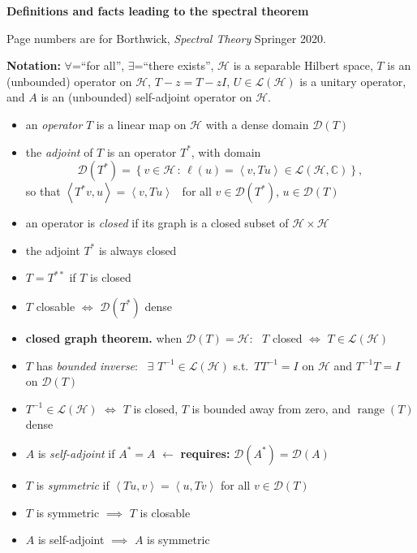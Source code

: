 \documentclass[11pt]{article}
\newcommand{\cD}{\mathcal{D}}
\newcommand{\cH}{\mathcal{H}}
\newcommand{\cL}{\mathcal{L}}
\newcommand{\CC}{\mathbb{C}}
\newcommand{\ip}[2]{\left<#1,#2\right>}
\newcommand{\range}{\operatorname{range}}
\newcommand{\sect}[1]{\subsection*{#1.}}
\begin{document}
\strut
\centerline{{\Large \textbf{Definitions and facts leading to the spectral theorem}}}

\normalsize
\medskip

Page numbers are for Borthwick, \emph{Spectral Theory} Springer 2020.

\textbf{Notation:} $\forall$=``for all'', $\exists$=``there exists'', $\cH$ is a separable Hilbert space, $T$ is an (unbounded) operator on $\cH$, $T-z=T-zI$, $U \in \cL(\cH)$ is a unitary operator, and $A$ is an (unbounded) self-adjoint operator on $\cH$.


\newcommand{\itwo}[2]{{\small \textbf{#1}} {\footnotesize p #2} \,\,}
\newcommand{\df}[1]{\,\itwo{def}{#1}}
\newcommand{\ft}[1]{\itwo{\underline{fact}}{#1}}

\begin{itemize}[leftmargin=10mm,itemsep=0mm]
\item[\df{36}] an \emph{operator} $T$ is a linear map on $\cH$ with a dense domain $\cD(T)$
\item[\df{38}] the \emph{adjoint} of $T$ is an operator $T^*$, with domain
	$$\cD(T^*) = \left\{v\in\cH\,:\,\ell(u)=\ip{v}{Tu} \in \cL(\cH,\CC)\right\},$$
so that $\ip{T^* v}{u} = \ip{v}{Tu}$ \, for all $v\in\cD(T^*)$, $u\in\cD(T)$
\item[\df{41}] an operator is \emph{closed} if its graph is a closed subset of $\cH\times \cH$
\item[\ft{43}] the adjoint $T^*$ is always closed
\item[\ft{44}] $T=T^{**}$ if $T$ is closed
\item[\ft{44}] $T$ closable $\iff$ $\cD(T^*)$ dense
\item[\ft{44}] \textbf{closed graph theorem.} when $\cD(T)=\cH$: \, $T$ closed $\iff$ $T\in\cL(\cH)$
\item[\df{46}] $T$ has \emph{bounded inverse}: \, $\exists$ $T^{-1}\in\cL(\cH)$ s.t.~$TT^{-1}=I$ on $\cH$ and $T^{-1}T=I$ on $\cD(T)$
\item[\ft{46}] $T^{-1}\in\cL(\cH)$ $\iff$ $T$ is closed, $T$ is bounded away from zero, and $\range(T)$ dense
\item[\df{47}] $A$ is \emph{self-adjoint} if $A^*=A$ \hfill {\footnotesize $\leftarrow$ \textbf{requires:} $\cD(A^*)=\cD(A)$}
\item[\df{47}] $T$ is \emph{symmetric} if $\ip{Tu}{v}=\ip{u}{Tv}$ for all $v\in\cD(T)$
\item[\ft{47}] $T$ is symmetric $\implies$ $T$ is closable
\item[\ft{47}] $A$ is self-adjoint $\implies$ $A$ is symmetric

\end{itemize}
\end{document}
